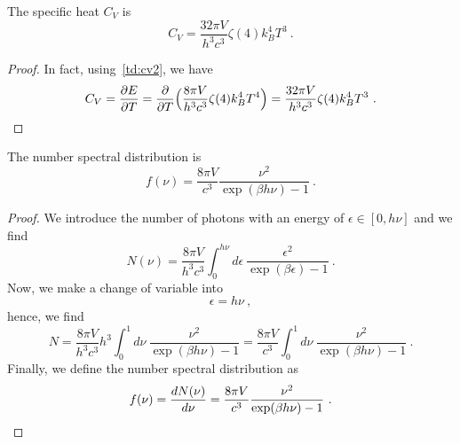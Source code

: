     The specific heat $C_V$ is 
    \begin{equation}
        C_V = \frac{32 \pi V}{h^3 c^3} \zeta(4) k_B^4 T^3 ~.
    \end{equation}
    \begin{proof}
        In fact, using~\eqref{td:cv2}, we have 
        \begin{equation}
            C_V = \frac{\partial E}{\partial T} = \frac{\partial}{\partial T} \Big ( \frac{8 \pi V}{h^3 c^3} \zeta(4) k_B^4 T^4 \Big )= \frac{32 \pi V}{h^3 c^3} \zeta(4) k_B^4 T^3 ~.
        \end{equation}
    \end{proof}

    The number spectral distribution is 
    \begin{equation}
        f (\nu) = \frac{8 \pi V}{c^3} \frac{\nu^2}{\exp(\beta h \nu) - 1} ~.
    \end{equation}
    \begin{proof}
        We introduce the number of photons with an energy of $\epsilon \in [0, h\nu]$ and we find
        \begin{equation}
            N(\nu) = \frac{8 \pi V}{h^3 c^3} \int_0^{h\nu} d\epsilon ~ \frac{\epsilon^2}{\exp(\beta \epsilon) - 1} ~.
        \end{equation}
        Now, we make a change of variable into 
        \begin{equation}
            \epsilon = h \nu ~,
        \end{equation}
        hence, we find 
        \begin{equation*}
            N = \frac{8 \pi V}{h^3 c^3} h^3 \int_0^{1} d\nu ~ \frac{\nu^2}{\exp(\beta h \nu) - 1} = \frac{8 \pi V}{c^3} \int_0^{1} d\nu ~ \frac{\nu^2}{\exp(\beta h \nu) - 1} ~.
        \end{equation*}
        Finally, we define the number spectral distribution as
        \begin{equation}
            f(\nu) = \frac{dN(\nu)}{d\nu} = \frac{8 \pi V}{c^3} \frac{\nu^2}{\exp(\beta h \nu) - 1} ~.
        \end{equation}
    \end{proof}

